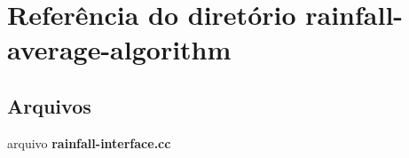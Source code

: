 \section{Referência do diretório rainfall-\/average-\/algorithm}
\label{dir_4394ccff38df69a29a0973c9fffd7ff4}
\subsection*{Arquivos}
\begin{DoxyCompactItemize}
\item 
arquivo {\bf rainfall-\/interface.\+cc}
\end{DoxyCompactItemize}
